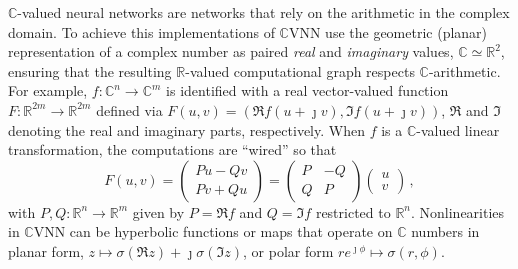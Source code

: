 \documentclass[a4paper,10pt,twocolumn]{article}
\newcommand{\real}{\mathbb{R}}
\newcommand{\cplx}{\mathbb{C}}
\newcommand{\iu}{{\jmath}}
\begin{document}
$\cplx$-valued neural networks are networks that rely on the arithmetic in the complex
domain. To achieve this implementations of $\cplx$VNN use the geometric (planar) representation
of a complex number as paired \emph{real} and \emph{imaginary} values, $\cplx \simeq \real^2$,
ensuring that the resulting $\real$-valued computational graph respects $\cplx$-arithmetic.
For example, $
  f\colon \cplx^n \to \cplx^m
$ is identified with a real vector-valued function $
  F\colon \real^{2 m} \to \real^{2 m}
$ defined via $
  F(u, v) = (\Re f(u + \iu v), \Im f(u + \iu v))
$, $\Re$ and $\Im$ denoting the real and imaginary parts, respectively. When $f$ is
a $\cplx$-valued linear transformation, the computations are ``wired'' so that
\begin{equation}  \label{eq:cplx-lin-op}
  F(u, v)
    =
    \begin{pmatrix}
      P u - Q v \\
      P v + Q u
    \end{pmatrix}
    = \begin{pmatrix}
      P & - Q \\ Q & P
    \end{pmatrix} \begin{pmatrix}
      u \\ v
    \end{pmatrix}
    \,,
\end{equation}
with $
  P, Q \colon \real^{n} \to \real^{m}
$ given by $P = \Re f$ and $Q = \Im f$ restricted to $\real^{n}$.
%
Nonlinearities in $\cplx$VNN can be hyperbolic functions or maps that operate on
$\cplx$ numbers in planar form, $
  z \mapsto \sigma(\Re{z}) + \iu \sigma(\Im{z}) %
$, or polar form $
  r e^{\iu \phi} \mapsto \sigma(r, \phi)
$.
\end{document}
